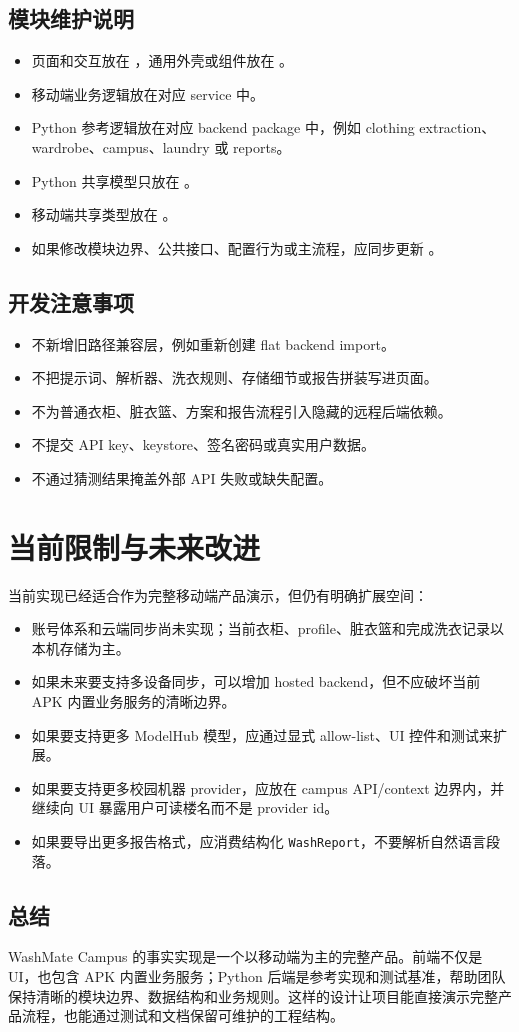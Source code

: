 \documentclass[11pt,a4paper]{ctexart}
\begin{document}
\subsection{模块维护说明}

\begin{itemize}
  \item 页面和交互放在 ，通用外壳或组件放在 。
  \item 移动端业务逻辑放在对应  service 中。
  \item Python 参考逻辑放在对应 backend package 中，例如 clothing extraction、wardrobe、campus、laundry 或 reports。
  \item Python 共享模型只放在 。
  \item 移动端共享类型放在 。
  \item 如果修改模块边界、公共接口、配置行为或主流程，应同步更新 。
\end{itemize}

\subsection{开发注意事项}

\begin{itemize}
  \item 不新增旧路径兼容层，例如重新创建 flat backend import。
  \item 不把提示词、解析器、洗衣规则、存储细节或报告拼装写进页面。
  \item 不为普通衣柜、脏衣篮、方案和报告流程引入隐藏的远程后端依赖。
  \item 不提交 API key、keystore、签名密码或真实用户数据。
  \item 不通过猜测结果掩盖外部 API 失败或缺失配置。
\end{itemize}

\section{当前限制与未来改进}

当前实现已经适合作为完整移动端产品演示，但仍有明确扩展空间：

\begin{itemize}
  \item 账号体系和云端同步尚未实现；当前衣柜、profile、脏衣篮和完成洗衣记录以本机存储为主。
  \item 如果未来要支持多设备同步，可以增加 hosted backend，但不应破坏当前 APK 内置业务服务的清晰边界。
  \item 如果要支持更多 ModelHub 模型，应通过显式 allow-list、UI 控件和测试来扩展。
  \item 如果要支持更多校园机器 provider，应放在 campus API/context 边界内，并继续向 UI 暴露用户可读楼名而不是 provider id。
  \item 如果要导出更多报告格式，应消费结构化 \texttt{WashReport}，不要解析自然语言段落。
\end{itemize}

\subsection{总结}

WashMate Campus 的事实实现是一个以移动端为主的完整产品。前端不仅是 UI，也包含 APK 内置业务服务；Python 后端是参考实现和测试基准，帮助团队保持清晰的模块边界、数据结构和业务规则。这样的设计让项目能直接演示完整产品流程，也能通过测试和文档保留可维护的工程结构。
\end{document}
